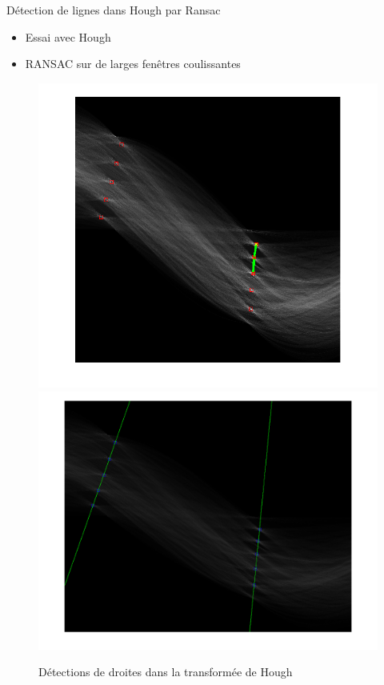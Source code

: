 \documentclass[11pt]{beamer}
\begin{document}
\begin{frame}{Détection de lignes dans Hough par Ransac}
\begin{itemize}
\item Essai avec Hough
\item RANSAC sur de larges fenêtres coulissantes
\end{itemize}
\begin{figure}
\begin{center}
\includegraphics[scale=0.238]{fig/houghlineshough.png}
\includegraphics[scale=0.2]{fig/houghlinesRANSAC.png}
\end{center}
\caption{\label{houghlines}Détections de droites dans la transformée de Hough}
\end{figure}
\end{frame}
\end{document}
